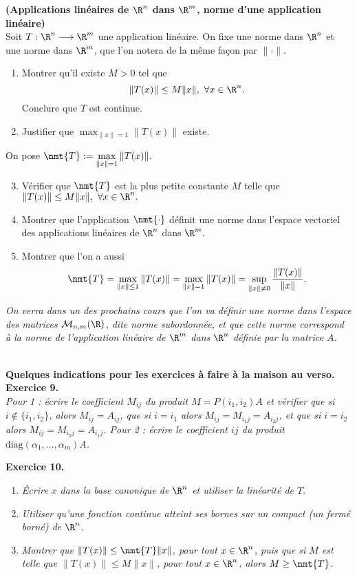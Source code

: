 \begin{exo}{\bf (Applications linéaires de $\R^n$ dans $\R^m$, norme d'une application linéaire)}\ \\
Soit $T:\R^n\longrightarrow\R^m$ une application linéaire. On fixe une norme dans $\R^n$ et une norme dans $\R^m$, que l'on notera de la même façon par $\|\cdot\|$.   
\begin{enumerate}
\item Montrer qu'il existe $M>0$ tel que
$$
\|T(x)\|\le M\|x\|,\ \forall x\in\R^n.
$$
Conclure que $T$ est continue.
\item Justifier que $\displaystyle{\max_{\|x\|=1}\|T(x)\|}$ existe. 
\end{enumerate}
On pose $\displaystyle{\nmt{T}:=\max_{\|x\|=1}\|T(x)\|}.$
\begin{enumerate}
\setcounter{enumi}{2} 
\item Vérifier que $\nmt{T}$ est la plus petite constante $M$ telle que $\|T(x)\|\le M\|x\|,\ \forall x\in\R^n.$
\item Montrer que l'application $\nmt{\cdot}$ définit une norme dans l'espace vectoriel des applications linéaires de $\R^n$ dans $\R^m.$
\item Montrer que l'on a aussi
  $$
  \nmt{T}=\max_{\|x\|\le1}\|T(x)\|=\max_{\|x\|=1}\|T(x)\|=\sup_{\|x\|\neq0}\frac{\|T(x)\|}{\|x\|}.
  $$
\end{enumerate}

{\color{blue}\it On verra dans un des prochains cours que l'on va définir une norme dans l'espace des matrices $\mathcal{M}_{n,m}(\R)$, dite norme subordonnée, et que cette norme correspond à la norme de l'application linéaire de $\R^m$ dans $\R^n$ définie par la matrice $A$.} 
\end{exo}
\ \\
{\bf Quelques indications pour les exercices à faire à la maison au verso.}
\newpage
{\bf Exercice 9.}\ \\
{\it Pour 1 : écrire le coefficient $M_{ij}$ du produit $M=P(i_1,i_2)A$ et vérifier que si $i\notin\{i_1,i_2\}$, alors $M_{ij}=A_{ij}$, que si $i=i_1$ alors $M_{ij}=M_{i_1j}=A_{i_2j}$, et que  si $i=i_2$ alors $M_{ij}=M_{i_2j}=A_{i_1j}$. Pour 2 : écrire le coefficient $ij$ du produit $\textrm{diag}(\alpha_1,\dots,\alpha_m)A$.}

{\bf Exercice 10.}
\begin{enumerate}
\item {\it Écrire $x$ dans la base canonique de $\R^n$ et utiliser la linéarité de $T$}.
\item {\it Utiliser qu'une fonction continue atteint ses bornes sur un compact (un fermé borné) de $\R^n$}.
  \item {\it Montrer que $\|T(x)\|\leq \nmt{T}\|x\|$, pour tout $x\in\R^n$, puis que si $M$ est telle que $\|T(x)\|\leq M\|x\|$, pour tout $x\in\R^n$, alors $M\geq\nmt{T}$.}
\end{enumerate}




